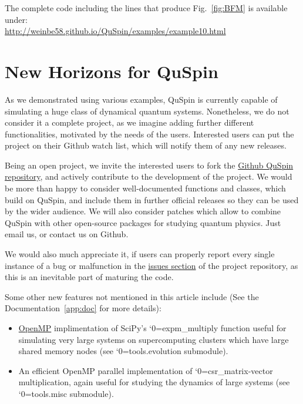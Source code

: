 \documentclass{SciPost}
\newcommand\0{\scalebox{-1}[1]{0}}
\let\svttfamily\ttfamily
\renewcommand\ttfamily{\svttfamily\catcode`0=\active }
\renewcommand\texttt{\bgroup\ttfamily\texttthelp}
\def\texttthelp#1{#1\egroup}
\begin{document}
The complete code including the lines that produce Fig.~\ref{fig:BFM} is available under:\\

\href{http://weinbe58.github.io/QuSpin/examples/example10.html}{http://weinbe58.github.io/QuSpin/examples/example10.html}\\



\section{New Horizons for QuSpin}
\label{sec:outro}
As we demonstrated using various examples, QuSpin is currently capable of simulating a huge class of dynamical quantum systems. Nonetheless, we do not consider it a complete project, as we imagine adding further different functionalities, motivated by the needs of the users. Interested users can put the project on their Github watch list, which will notify them of any new releases.

Being an open project, we invite the interested users to fork the \href{https://github.com/weinbe58/QuSpin}{Github QuSpin repository}, and actively contribute to the development of the project. We would be more than happy to consider well-documented functions and classes, which build on QuSpin, and include them in further official releases so they can be used by the wider audience. We will also consider patches which allow to combine QuSpin with other open-source packages for studying quantum physics. Just email us, or contact us on Github.

We would also much appreciate it, if users can properly report every single instance of a bug or malfunction in the \href{https://github.com/weinbe58/QuSpin/issues}{issues section} of the project repository, as this is an inevitable part of maturing the code.

Some other new features not mentioned in this article include (See the Documentation~\ref{app:doc} for more details):

\begin{itemize}
	\item \href{http://www.openmp.org/}{OpenMP} implimentation of SciPy's \texttt{expm\_multiply} function useful for simulating very large systems on supercomputing clusters which have large shared memory nodes (see \texttt{tools.evolution} submodule).
	\item An efficient OpenMP parallel implementation of \texttt{csr\_matrix}-vector multiplication, again useful for studying the dynamics of large systems (see \texttt{tools.misc} submodule).
\end{itemize}
\end{document}
